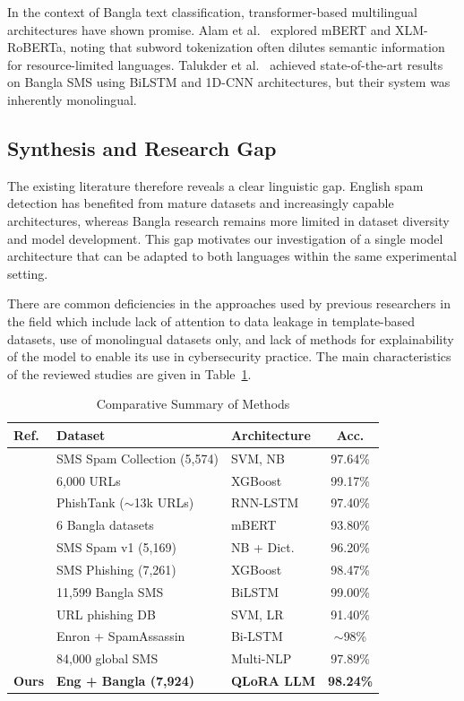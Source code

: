\documentclass[journal]{IEEEtran}
\begin{document}
In the context of Bangla text classification, transformer-based multilingual architectures have shown promise. Alam et al.~\cite{ref4} explored mBERT and XLM-RoBERTa, noting that subword tokenization often dilutes semantic information for resource-limited languages. Talukder et al.~\cite{ref7} achieved state-of-the-art results on Bangla SMS using BiLSTM and 1D-CNN architectures, but their system was inherently monolingual.

\subsection{Synthesis and Research Gap}

The existing literature therefore reveals a clear linguistic gap. English spam detection has benefited from mature datasets and increasingly capable architectures, whereas Bangla research remains more limited in dataset diversity and model development. This gap motivates our investigation of a single model architecture that can be adapted to both languages within the same experimental setting.

There are common deficiencies in the approaches used by
previous researchers in the field which include lack of attention to
data leakage in template-based datasets, use of monolingual datasets
only, and lack of methods for explainability of the model to enable its
use in cybersecurity practice. The main characteristics of the reviewed
studies are given in Table~\ref{tab:comparative}.

\begin{table}[htbp]
\caption{Comparative Summary of Methods}
\label{tab:comparative}
\centering
\begin{tabular}{lllc}
\toprule
\textbf{Ref.} & \textbf{Dataset} & \textbf{Architecture} & \textbf{Acc.} \\
\midrule
\cite{ref1} & SMS Spam Collection (5,574) & SVM, NB & 97.64\% \\
\cite{ref2} & 6,000 URLs & XGBoost & 99.17\% \\
\cite{ref3} & PhishTank ($\sim$13k URLs) & RNN-LSTM & 97.40\% \\
\cite{ref4} & 6 Bangla datasets & mBERT & 93.80\% \\
\cite{ref5} & SMS Spam v1 (5,169) & NB + Dict. & 96.20\% \\
\cite{ref6} & SMS Phishing (7,261) & XGBoost & 98.47\% \\
\cite{ref7} & 11,599 Bangla SMS & BiLSTM & 99.00\% \\
\cite{ref8} & URL phishing DB & SVM, LR & 91.40\% \\
\cite{ref9} & Enron + SpamAssassin & Bi-LSTM & $\sim$98\% \\
\cite{ref10} & 84,000 global SMS & Multi-NLP & 97.89\% \\
\textbf{Ours} & \textbf{Eng + Bangla (7,924)} & \textbf{QLoRA LLM} & \textbf{98.24\%} \\
\bottomrule
\end{tabular}
\end{table}
\end{document}
